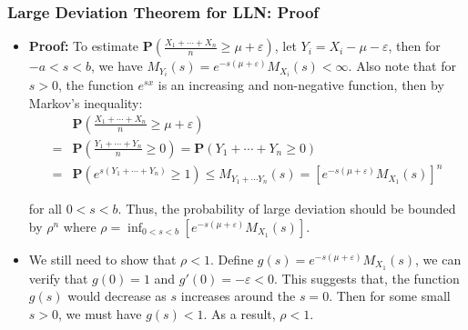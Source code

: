 \documentclass[handout]{beamer}
\newcommand{\BP}{\mathbf{P}}
\begin{document}
\frame
{
  \frametitle{Large Deviation Theorem for LLN: Proof} 

   \begin{itemize}

                 \item<1-> \textbf{Proof:} To estimate $\BP(\frac{X_1+\cdots+X_n}{n}\geq \mu+\varepsilon)$, let $Y_i=X_i-\mu-\varepsilon$, then for $-a<s<b$, we have $M_{Y_i}(s)=e^{-s(\mu+\varepsilon)} M_{X_i} (s) <\infty$. Also note that for $s>0$, the function $e^{sx}$ is an increasing and non-negative function, then by Markov's inequality: 
                          \begin{align*} &  \BP(\frac{X_1+\cdots+X_n}{n}\geq \mu+\varepsilon) \\ =  & \BP(\frac{Y_1+\cdots+Y_n}{n}\geq 0) = \BP(Y_1+\cdots+Y_n\geq 0) \\ = &   \BP(e^{s(Y_1+\cdots+Y_n)}\geq 1) \leq M_{Y_1+\cdots Y_n} (s)= [ e^{-s(\mu+\varepsilon)} M_{X_1} (s) ]^n \end{align*}
      
              for all $0<s<b$. Thus, the probability of large deviation should be bounded by $\rho^n$ where $\rho=\inf_{0<s<b} [e^{-s(\mu+\varepsilon)} M_{X_1} (s) ]$. 
              
 
                 \item<2->[-] We still need to show that $\rho<1$. Define $g(s)=e^{-s(\mu+\varepsilon)} M_{X_1} (s) $, we can verify that $g(0)=1$ and $g'(0)=-\varepsilon<0$.  This suggests that, the function $g(s)$ would decrease as $s$ increases around the $s=0$. Then for some small $s>0$, we must have $g(s)<1$. As a result,  $\rho<1$.
                           
          
                            \end{itemize}
}
\end{document}
